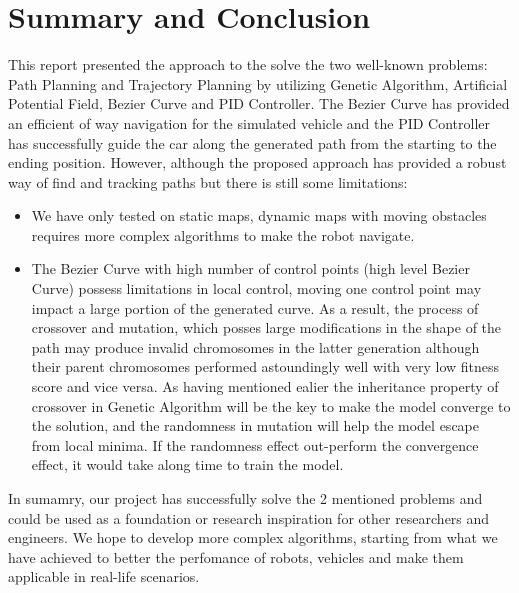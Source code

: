 \section{Summary and Conclusion}
This report presented the approach to the solve the two well-known problems: Path Planning and Trajectory Planning by utilizing Genetic Algorithm, Artificial Potential Field, Bezier Curve and PID Controller.
The Bezier Curve has provided an efficient of way navigation for the simulated vehicle and the PID Controller has successfully guide the car along the generated path from the starting to the ending position.
However, although the proposed approach has provided a robust way of find and tracking paths but there is still some limitations:
\begin{itemize}
  \item We have only tested on static maps, dynamic maps with moving obstacles requires more complex algorithms to make the robot navigate.
  \item The Bezier Curve with high number of control points (high level Bezier Curve) possess limitations in local control, moving one control point may impact a large portion of the generated curve.
  As a result, the process of crossover and mutation, which posses large modifications in the shape of the path may produce invalid chromosomes in the latter generation although their parent chromosomes performed astoundingly well with very low fitness score and vice versa.
  As having mentioned ealier the inheritance property of crossover in Genetic Algorithm will be the key to make the model converge to the solution, and the randomness in mutation will help the model escape from local minima.
  If the randomness effect out-perform the convergence effect, it would take along time to train the model.
\end{itemize}
In sumamry, our project has successfully solve the 2 mentioned problems and could be used as a foundation or research inspiration for other researchers and engineers.
We hope to develop more complex algorithms, starting from what we have achieved to better the perfomance of robots, vehicles and make them applicable in real-life scenarios.
